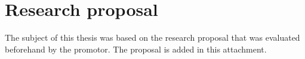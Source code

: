 \documentclass[fleqn,a4paper,12pt]{book}
\begin{document}


\inserttitlepage

\usechapterimagefalse



\pagestyle{empty} %
\tableofcontents %
\cleardoublepage %
\pagestyle{fancy} %











%
%



\appendix


\chapter{Research proposal}

The subject of this thesis was based on the research proposal that was evaluated beforehand by the promotor. The proposal is added in this attachment.



%


\printbibliography[heading=bibintoc]
\end{document}
